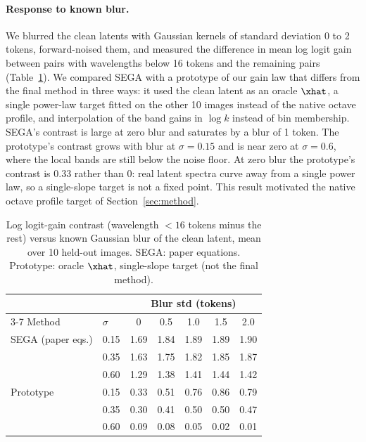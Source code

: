 \paragraph{Response to known blur.}
We blurred the clean latents with Gaussian kernels of standard deviation 0 to 2 tokens, forward-noised them, and measured the difference in mean log logit gain between pairs with wavelengths below 16 tokens and the remaining pairs (Table~\ref{tab:blur}). We compared SEGA with a prototype of our gain law that differs from the final method in three ways: it used the clean latent as an oracle $\xhat$, a single power-law target fitted on the other 10 images instead of the native octave profile, and interpolation of the band gains in $\log k$ instead of bin membership. SEGA's contrast is large at zero blur and saturates by a blur of 1 token. The prototype's contrast grows with blur at $\sigma=0.15$ and is near zero at $\sigma=0.6$, where the local bands are still below the noise floor. At zero blur the prototype's contrast is 0.33 rather than 0: real latent spectra curve away from a single power law, so a single-slope target is not a fixed point. This result motivated the native octave profile target of Section~\ref{sec:method}.

\begin{table}[t]
\centering
\small
\caption{Log logit-gain contrast (wavelength $<16$ tokens minus the rest) versus known Gaussian blur of the clean latent, mean over 10 held-out images. SEGA: paper equations. Prototype: oracle $\xhat$, single-slope target (not the final method).}
\label{tab:blur}
\begin{tabular}{@{}llccccc@{}}
\toprule
 & & \multicolumn{5}{c}{Blur std (tokens)} \\
\cmidrule(l){3-7}
Method & $\sigma$ & 0 & 0.5 & 1.0 & 1.5 & 2.0 \\
\midrule
SEGA (paper eqs.) & 0.15 & 1.69 & 1.84 & 1.89 & 1.89 & 1.90 \\
                  & 0.35 & 1.63 & 1.75 & 1.82 & 1.85 & 1.87 \\
                  & 0.60 & 1.29 & 1.38 & 1.41 & 1.44 & 1.42 \\
\midrule
Prototype         & 0.15 & 0.33 & 0.51 & 0.76 & 0.86 & 0.79 \\
                  & 0.35 & 0.30 & 0.41 & 0.50 & 0.50 & 0.47 \\
                  & 0.60 & 0.09 & 0.08 & 0.05 & 0.02 & 0.01 \\
\bottomrule
\end{tabular}
\end{table}

